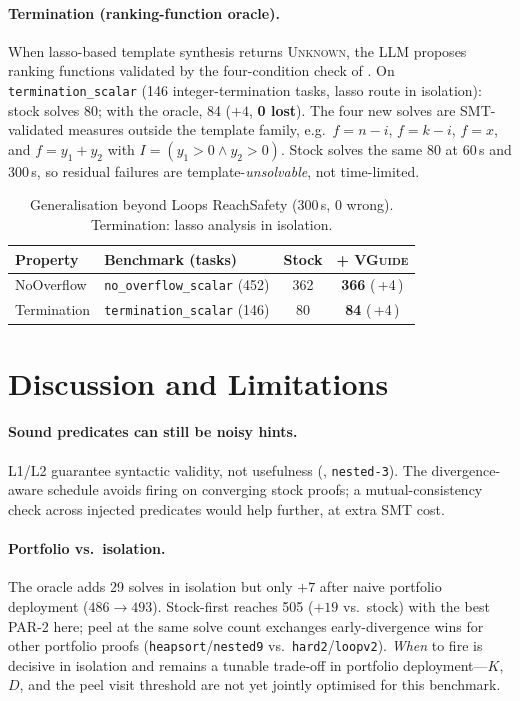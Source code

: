 \documentclass[runningheads]{llncs}
\newcommand{\tool}{\textsc{VGuide}}
\begin{document}
\paragraph{Termination (ranking-function oracle).} When lasso-based template synthesis returns
\textsc{Unknown}, the LLM proposes ranking functions validated by the four-condition check of
. On \texttt{termination\_scalar} (146 integer-termination tasks, lasso route in
isolation): stock solves 80; with the oracle, 84 ($+4$, \textbf{0 lost}). The four new solves are
SMT-validated measures outside the template family, e.g.\ $f=n-i$, $f=k-i$, $f=x$, and
$f=y_1+y_2$ with $I=(y_1>0\wedge y_2>0)$. Stock solves the same 80 at 60\,s and 300\,s, so
residual failures are template-\emph{unsolvable}, not time-limited.

\begin{table}[t]
\caption{Generalisation beyond Loops ReachSafety (300\,s, 0 wrong). Termination: lasso analysis
in isolation.}
\label{tab:generalisation}
\centering
\begin{tabular}{llcc}
\toprule
Property & Benchmark (tasks) & Stock & + \tool{} \\
\midrule
NoOverflow & \texttt{no\_overflow\_scalar} (452) & 362 & \textbf{366} (\,+4\,) \\
Termination & \texttt{termination\_scalar} (146) & 80 & \textbf{84} (\,+4\,) \\
\bottomrule
\end{tabular}
\end{table}

\section{Discussion and Limitations}
\label{sec:discussion}

\paragraph{Sound predicates can still be noisy hints.} L1/L2 guarantee syntactic validity, not
usefulness (, \texttt{nested-3}). The divergence-aware schedule avoids
firing on converging stock proofs; a mutual-consistency check across injected predicates would
help further, at extra SMT cost.

\paragraph{Portfolio vs.\ isolation.} The oracle adds 29 solves in isolation but only $+7$ after
naive portfolio deployment ($486{\to}493$). Stock-first reaches 505 ($+19$ vs.\ stock) with the
best PAR-2 here; peel at the same solve count exchanges early-divergence wins for other portfolio
proofs (\texttt{heapsort}/\texttt{nested9} vs.\ \texttt{hard2}/\texttt{loopv2}). \emph{When} to
fire is decisive in isolation and remains a tunable trade-off in portfolio deployment---$K$, $D$,
and the peel visit threshold are not yet jointly optimised for this benchmark.
\end{document}
